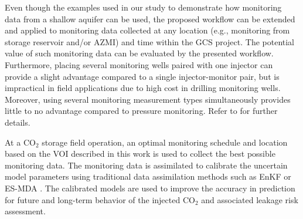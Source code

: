 \documentclass[a4paper,fleqn]{cas-sc}
\begin{document}
Even though the examples used in our study to demonstrate how monitoring data from a shallow aquifer can be used, the proposed workflow can be extended and applied to monitoring data collected at any location (e.g., monitoring from storage reservoir and/or AZMI) and time within the GCS project. The potential value of such monitoring data can be evaluated by the presented workflow. Furthermore, placing several monitoring wells paired with one injector can provide a slight advantage compared to a single injector-monitor pair, but is impractical in field applications due to high cost in drilling monitoring wells. Moreover, using several monitoring measurement types simultaneously provides little to no advantage compared to pressure monitoring. Refer to \citet{Chen2018} for further details.

At a CO$_2$ storage field operation, an optimal monitoring schedule and location based on the VOI described in this work is used to collect the best possible monitoring data. The monitoring data is assimilated to calibrate the uncertain model parameters using traditional data assimilation methods such as EnKF \citep{Evensen20091} or ES-MDA \citep{Emerick20133}. The calibrated models are used to improve the accuracy in prediction for future and long-term behavior of the injected CO$_2$ and associated leakage risk assessment.

\end{document}
